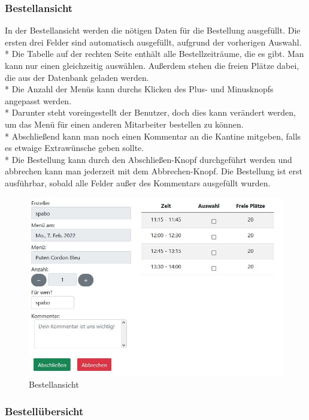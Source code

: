 \subsubsection {Bestellansicht}

In der Bestellansicht werden die nötigen Daten für die Bestellung ausgefüllt. Die ersten drei Felder sind automatisch ausgefüllt, aufgrund der vorherigen Auswahl. \\*
Die Tabelle auf der rechten Seite enthält alle Bestellzeiträume, die es gibt. Man kann nur einen gleichzeitig auswählen. Außerdem stehen die freien Plätze dabei, die aus der Datenbank geladen werden.\\*
Die Anzahl der Menüs kann durchs Klicken des Plus- und Minusknopfs angepasst werden.  \\*
Darunter steht voreingestellt der Benutzer, doch dies kann verändert werden, um das Menü für einen anderen Mitarbeiter bestellen zu können. \\*
Abschließend kann man noch einen Kommentar an die Kantine mitgeben, falls es etwaige Extrawünsche geben sollte. \\*
Die Bestellung kann durch den Abschließen-Knopf durchgeführt werden und abbrechen kann man jederzeit mit dem Abbrechen-Knopf.
Die Bestellung ist erst ausführbar, sobald alle Felder außer des Kommentars ausgefüllt wurden.
\begin{figure}[htp]
    \centering
    \includegraphics[scale=0.7]{pics/mitarbeiter-bestellen.JPG}
    \caption{Bestellansicht}
    \label{fig:impl:BestellenMitarbeiter}
\end{figure}
\pagebreak

\subsubsection {Bestellübersicht}


